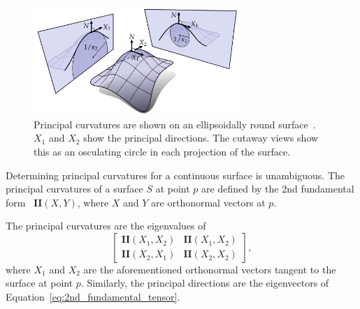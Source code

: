 \begin{figure}[htb]
	\centering
	\includegraphics[width=0.7\textwidth]{../resources/curvature/principal_curvatures.png}
	\caption{
Principal curvatures are shown on an ellipsoidally round surface~\cite{Digital_geom_proc_w_disc_ext_calc}.
$X_1$ and $X_2$ show the principal directions.
The cutaway views show this as an osculating circle in each projection of the surface.
}
	\label{fig:principal_k}
\end{figure}

Determining principal curvatures for a continuous surface is unambiguous.
The principal curvatures of a surface $S$ at point $p$ are defined by the 2nd fundamental form~\cite{DiffGeo_curves_surfaces, Basic_diff_geo_of_surfaces, DDGAppIntro_17_smooth_k} $\textbf{II}(X,Y)$, where $X$ and $Y$ are orthonormal vectors at $p$.

The principal curvatures are the eigenvalues of
\begin{equation}\label{eq:2nd_fundamental_tensor}
	\begin{bmatrix}
		\textbf{II}(X_1, X_2) & \textbf{II}(X_1, X_2) \\
		\textbf{II}(X_2, X_1) & \textbf{II}(X_2, X_2)
	\end{bmatrix},
\end{equation}
where $X_1$ and $X_2$ are the aforementioned orthonormal vectors tangent to the surface at point $p$.
Similarly, the principal directions are the eigenvectors of Equation~\ref{eq:2nd_fundamental_tensor}.

